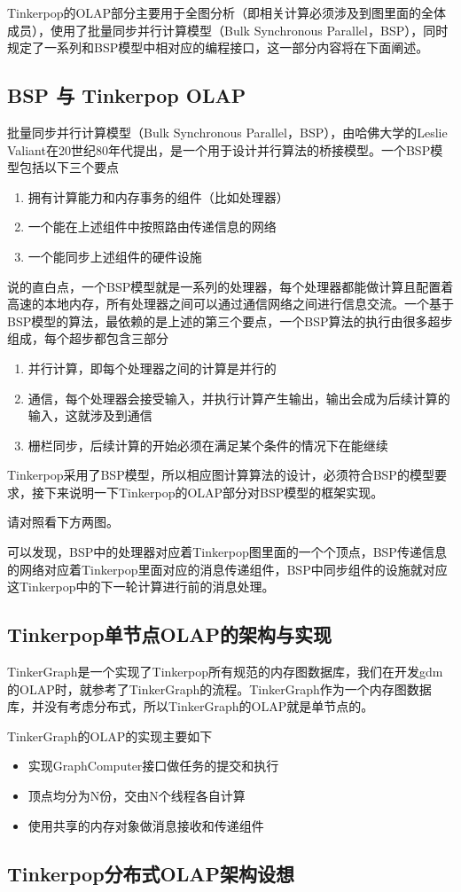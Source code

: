\documentclass{article}
\begin{document}
Tinkerpop的OLAP部分主要用于全图分析（即相关计算必须涉及到图里面的全体成员），使用了批量同步并行计算模型（Bulk Synchronous Parallel，BSP），同时规定了一系列和BSP模型中相对应的编程接口，这一部分内容将在下面阐述。

\subsection{BSP 与 Tinkerpop OLAP}
批量同步并行计算模型（Bulk Synchronous Parallel，BSP），由哈佛大学的Leslie Valiant在20世纪80年代提出，是一个用于设计并行算法的桥接模型。一个BSP模型包括以下三个要点

\begin{enumerate}
\item 拥有计算能力和内存事务的组件（比如处理器）
\item 一个能在上述组件中按照路由传递信息的网络
\item 一个能同步上述组件的硬件设施
\end{enumerate}

说的直白点，一个BSP模型就是一系列的处理器，每个处理器都能做计算且配置着高速的本地内存，所有处理器之间可以通过通信网络之间进行信息交流。一个基于BSP模型的算法，最依赖的是上述的第三个要点，一个BSP算法的执行由很多超步组成，每个超步都包含三部分

\begin{enumerate}
\item 并行计算，即每个处理器之间的计算是并行的
\item 通信，每个处理器会接受输入，并执行计算产生输出，输出会成为后续计算的输入，这就涉及到通信
\item 栅栏同步，后续计算的开始必须在满足某个条件的情况下在能继续
\end{enumerate}

Tinkerpop采用了BSP模型，所以相应图计算算法的设计，必须符合BSP的模型要求，接下来说明一下Tinkerpop的OLAP部分对BSP模型的框架实现。

请对照看下方两图。

可以发现，BSP中的处理器对应着Tinkerpop图里面的一个个顶点，BSP传递信息的网络对应着Tinkerpop里面对应的消息传递组件，BSP中同步组件的设施就对应这Tinkerpop中的下一轮计算进行前的消息处理。

\subsection{Tinkerpop单节点OLAP的架构与实现}
TinkerGraph是一个实现了Tinkerpop所有规范的内存图数据库，我们在开发gdm的OLAP时，就参考了TinkerGraph的流程。TinkerGraph作为一个内存图数据库，并没有考虑分布式，所以TinkerGraph的OLAP就是单节点的。

TinkerGraph的OLAP的实现主要如下
\begin{itemize}
\item 实现GraphComputer接口做任务的提交和执行
\item 顶点均分为N份，交由N个线程各自计算
\item 使用共享的内存对象做消息接收和传递组件
\end{itemize}

\subsection{Tinkerpop分布式OLAP架构设想}
\end{document}
